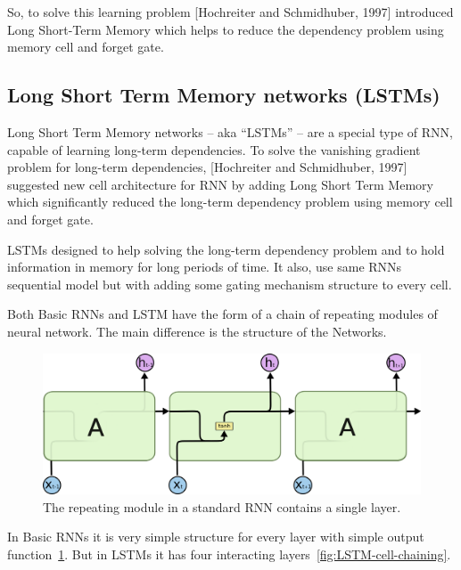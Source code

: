  So, to solve this learning problem [Hochreiter and Schmidhuber, 1997] introduced Long Short-Term Memory which helps to reduce the dependency problem using memory cell and forget gate.
\newpage
\subsection{Long Short Term Memory networks (LSTMs)}\label{sec_LSTM}


Long Short Term Memory networks – aka “LSTMs” – are a special type of RNN, capable of learning long-term dependencies. To solve the vanishing gradient problem for long-term dependencies, [Hochreiter and Schmidhuber, 1997]\cite{Hochreiter} suggested new cell architecture for RNN by adding Long Short Term Memory which significantly reduced the long-term dependency problem using memory cell and forget gate.

 LSTMs designed to help solving the long-term dependency problem and to hold information in memory for long periods of time. It also, use same RNNs sequential model but with adding some gating mechanism structure to every cell.

 Both Basic RNNs and LSTM have the form of a chain of repeating modules of neural network. The main difference is the structure of the Networks.
 
\begin{figure}[ht!] \includegraphics[width=\linewidth]{./Figures/Ch_2_Background/LSTM-SimpleRNN.png}
  \caption{The repeating module in a standard RNN contains a single layer.\cite{colah}}
  \label{fig:LSTM-SimpleRNN}
\end{figure}

In Basic RNNs it is very simple structure for every layer with simple output function~\ref{fig:LSTM-SimpleRNN}. But in LSTMs it has four interacting layers~\ref{fig:LSTM-cell-chaining}. 


